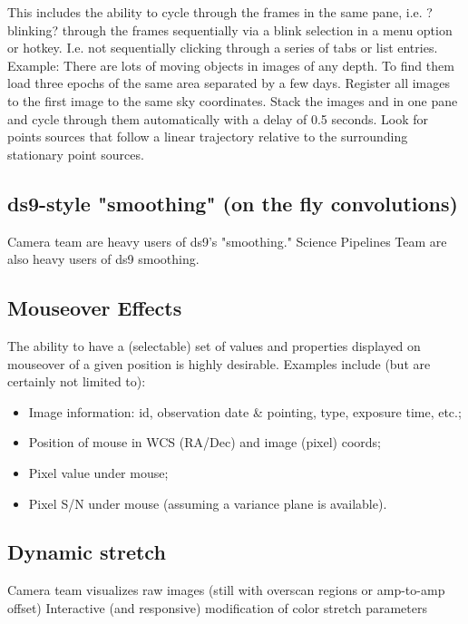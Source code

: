 \begin{itemize}
{This includes the ability to cycle through the frames in the same pane, i.e. ?blinking? through the frames sequentially via a blink selection in a menu option or hotkey.  I.e. not sequentially clicking through a series of tabs or list entries.
Example: There are lots of moving objects in images of any depth.  To find them load three epochs of the same area separated by a few days.  Register all images to the first image to the same sky coordinates.  Stack the images and in one pane and cycle through them automatically with a delay of 0.5 seconds.  Look for points sources that follow a linear trajectory relative to the surrounding stationary point sources.}
\end{itemize}

\subsection{ds9-style "smoothing" (on the fly convolutions)}
Camera team are heavy users of ds9's  "smoothing."
Science Pipelines Team are also heavy users of ds9 smoothing.

\subsection{Mouseover Effects}
The ability to have a (selectable) set of values and properties displayed on mouseover of a given position is highly desirable.  Examples include (but are certainly not limited to):
\begin{itemize}
\item{Image information: id, observation date \& pointing, type, exposure time, etc.;}
\item{Position of mouse in WCS (RA/Dec) and image (pixel) coords;}
\item{Pixel value under mouse;}
\item{Pixel S/N under mouse (assuming a variance plane is available).}
\end{itemize}

\subsection{Dynamic stretch}

Camera team visualizes raw images (still with overscan regions or amp-to-amp offset)
Interactive (and responsive) modification of color stretch parameters

